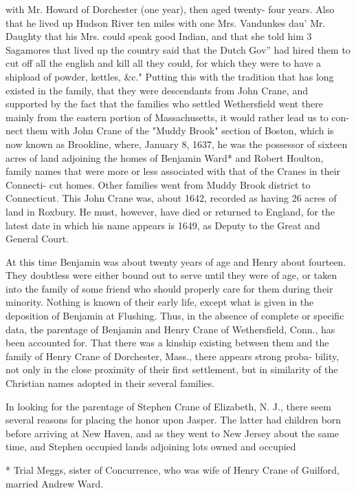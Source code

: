 \documentclass{book}
\begin{document}
with Mr. Howard of Dorchester (one year), then aged twenty- 
four years. Also that he lived up Hudson River ten miles 
with one Mrs. Vandunkes dau' Mr. Daughty that his Mrs. 
could speak good Indian, and that she told him 3 Sagamores that 
lived up the country said that the Dutch Gov'' had hired them to 
cut off all the english and kill all they could, for which they were 
to have a shipload of powder, kettles, \&c." Putting this with 
the tradition that has long existed in the family, that they were 
descendants from John Crane, and supported by the fact that 
the families who settled Wethersfield went there mainly from the 
eastern portion of Massachusetts, it would rather lead us to con- 
nect them with John Crane of the "Muddy Brook" section of 
Boston, which is now known as Brookline, where, January 8, 1637, 
he was the possessor of sixteen acres of land adjoining the homes 
of Benjamin Ward* and Robert Houlton, family names that were 
more or less associated with that of the Cranes in their Connecti- 
cut homes. Other families went from Muddy Brook district to 
Connecticut. This John Crane was, about 1642, recorded as 
having 26 acres of land in Roxbury. He must, however, have 
died or returned to England, for the latest date in which his name 
appears is 1649, as Deputy to the Great and General Court. 

At this time Benjamin was about twenty years of age and 
Henry about fourteen. They doubtless were either bound out to 
serve until they were of age, or taken into the family of some 
friend who should properly care for them during their minority. 
Nothing is known of their early life, except what is given in the 
deposition of Benjamin at Flushing. Thus, in the absence of 
complete or specific data, the parentage of Benjamin and Henry 
Crane of Wethersfield, Conn., has been accounted for. That 
there was a kinship existing between them and the family of 
Henry Crane of Dorchester, Mass., there appears strong proba- 
bility, not only in the close proximity of their first settlement, but 
in similarity of the Christian names adopted in their several 
families. 

In looking for the parentage of Stephen Crane of Elizabeth, 
N. J., there seem several reasons for placing the honor upon 
Jasper. The latter had children born before arriving at New 
Haven, and as they went to New Jersey about the same time, 
and Stephen occupied lands adjoining lots owned and occupied 

* Trial Meggs, sister of Concurrence, who was wife of Henry Crane 
of Guilford, married Andrew Ward. 
\end{document}

